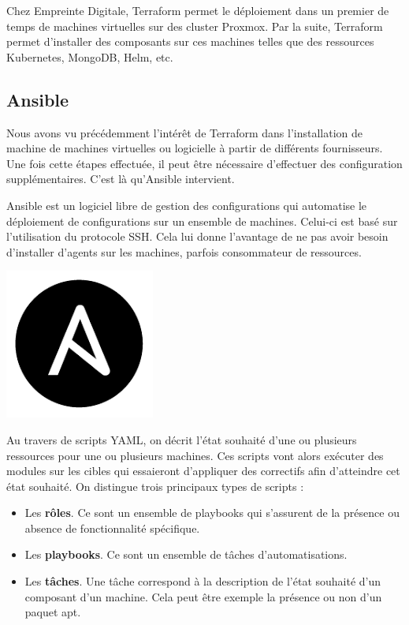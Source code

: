 \documentclass[12pt]{article}
\begin{document}
Chez Empreinte Digitale, Terraform permet le déploiement dans un premier de temps de machines virtuelles sur des cluster Proxmox. 
Par la suite, Terraform permet d'installer des composants sur ces machines telles que des ressources Kubernetes, MongoDB, Helm, etc.

\newpage
\subsection{Ansible}
Nous avons vu précédemment l'intérêt de Terraform dans l'installation de machine de machines virtuelles ou logicielle à partir de différents fournisseurs. 
Une fois cette étapes effectuée, il peut être nécessaire d'effectuer des configuration supplémentaires. 
C'est là qu'Ansible intervient.

\noindent%
\begin{minipage}{.8\textwidth}%
Ansible est un logiciel libre de gestion des configurations qui automatise le déploiement de configurations sur un ensemble de machines. 
Celui-ci est basé sur l'utilisation du protocole SSH. 
Cela lui donne l'avantage de ne pas avoir besoin d'installer d'agents sur les machines, parfois consommateur de ressources.

\end{minipage}%
\hfill
\begin{minipage}{.2\textwidth}%
\begin{center}
\includegraphics[scale=0.3]{src/ansible.png}
\end{center}
\end{minipage}%

Au travers de scripts YAML, on décrit l'état souhaité d'une ou plusieurs ressources pour une ou plusieurs machines. 
Ces scripts vont alors exécuter des modules sur les cibles qui essaieront d'appliquer des correctifs afin d'atteindre cet état souhaité. 
On distingue trois principaux types de scripts :
\begin{itemize}
    \item Les \textbf{rôles}. Ce sont un ensemble de playbooks qui s'assurent de la présence ou absence de fonctionnalité spécifique.
    \item Les \textbf{playbooks}. Ce sont un ensemble de tâches d'automatisations.
    \item Les \textbf{tâches}. Une tâche correspond à la description de l'état souhaité d'un composant d'un machine. 
    Cela peut être exemple la présence ou non d'un paquet apt.
\end{itemize}
\end{document}
